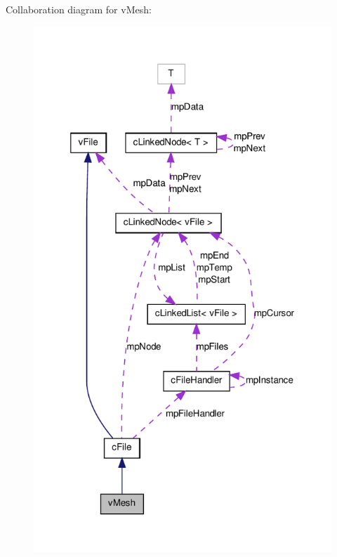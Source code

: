 Collaboration diagram for vMesh:
\nopagebreak
\begin{figure}[H]
\begin{center}
\leavevmode
\includegraphics[width=320pt]{classv_mesh__coll__graph}
\end{center}
\end{figure}
